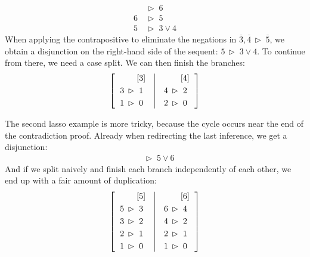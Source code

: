 \documentclass[withtimes,a4paper,12pt]{easychair}
\let\B=\overline
\newcommand\have{\mathrel{\,\vartriangleright\;}}
\begin{document}
%
\begin{align*}
& \have 6 \\
6 & \have 5 \\
5 & \have 3 \lor 4
\end{align*}
%
When applying the contrapositive to eliminate the negations in $\B 3, \B 4 \have
\B 5$, we obtain a disjunction on the right-hand side of the sequent: $5 \have 3
\lor 4$. To continue from there, we need a case split. We can then finish the
branches:
%
\[\left[\begin{tabular}{l|l} %
    $\begin{aligned}[t]
      [&3] \\
      3 \have {} & 1 \\
      1 \have {} & 0
    \end{aligned}$\enskip\hbox{}&\enskip
    $\begin{aligned}[t] 
      [&4] \\
      4 \have {} & 2 \\
      2 \have {} & 0
    \end{aligned}$
  \end{tabular}\right]\]

The second lasso example is more tricky, because the cycle occurs near the end
of the contradiction proof. Already when redirecting the last inference, we get
a disjunction:
%
\begin{align*}
& \have 5 \lor 6
\end{align*}
%
And if we split naively and finish each branch independently of each other,
we end up with a fair amount of duplication:
\pagebreak[3]
\[\left[\begin{tabular}{l|l} %
    $\begin{aligned}[t]
      [&5] \\
      5 \have {} & 3 \\
      3 \have {} & 2 \\
      2 \have {} & 1 \\
      1 \have {} & 0 \\
    \end{aligned}$\enskip\hbox{}&\enskip
    $\begin{aligned}[t] 
      [&6] \\
      6 \have {} & 4 \\
      4 \have {} & 2 \\
      2 \have {} & 1 \\
      1 \have {} & 0 \\
    \end{aligned}$
  \end{tabular}\right]\]
\end{document}
